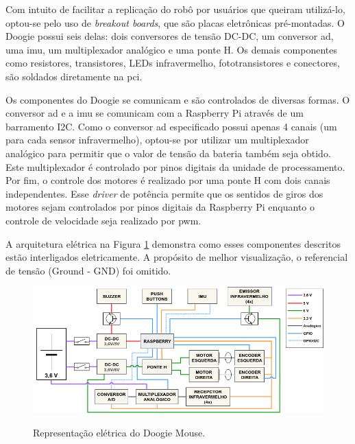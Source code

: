 Com intuito de facilitar a replicação do robô por usuários que queiram utilizá-lo, optou-se pelo uso de \textit{breakout boards}, que são placas eletrônicas pré-montadas. O Doogie possui seis delas: dois conversores de tensão DC-DC, um conversor \gls*{ad}, uma \gls*{imu}, um multiplexador analógico e uma ponte H. Os demais componentes como resistores, transistores, LEDs infravermelho, fototransistores e conectores, são soldados diretamente na \gls*{pci}.

Os componentes do Doogie se comunicam e são controlados de diversas formas. O conversor \gls*{ad} e a \gls*{imu} se comunicam com a Raspberry Pi através de um barramento I2C. Como o conversor \gls*{ad} especificado possui apenas 4 canais (um para cada sensor infravermelho), optou-se por utilizar um multiplexador analógico para permitir que o valor de tensão da bateria também seja obtido. Este multiplexador é controlado por pinos digitais da unidade de processamento. Por fim, o controle dos motores é realizado por uma ponte H com dois canais independentes. Esse \textit{driver} de potência permite que os sentidos de giros dos motores sejam controlados por pinos digitais da Raspberry Pi enquanto o controle de velocidade seja realizado por \gls*{pwm}.

A arquitetura elétrica na Figura \ref{fig:arquitetura_eletrica} demonstra como esses componentes descritos estão interligados eletricamente. A propósito de melhor visualização, o referencial de tensão (Ground - GND) foi omitido.

\begin{figure}[H]
	\centering
	\caption{Representação elétrica do Doogie Mouse.}
	\includegraphics[width=1\textwidth]
	{Figures/arquitetura_eletrica}
	\label{fig:arquitetura_eletrica}
\end{figure}

